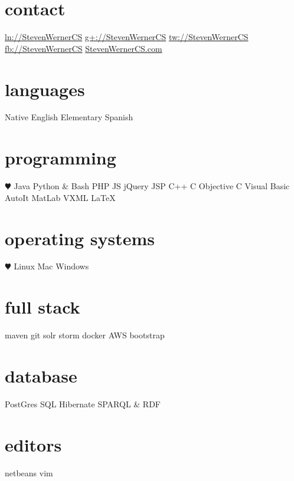 \documentclass[]{friggeri-cv} %
\begin{document}


\begin{aside1} 
\section{contact}
\href{http://linkedin.com/in/StevenWernerCS}{ln://StevenWernerCS}
\href{https://plus.google.com/+StevenWernerCS}{g+://StevenWernerCS}
\href{http://www.twitter.com/StevenWernerCS}{tw://StevenWernerCS}
\href{http://facebook.com/StevenWernerCS}{fb://StevenWernerCS}
\href{http://www.StevenWernerCS.com}{StevenWernerCS.com}
\section{languages}
Native English
Elementary Spanish
\section{programming}
{\color{red} $\varheartsuit$} Java Python \& Bash
PHP JS jQuery JSP
C++ C Objective C
Visual Basic AutoIt 
MatLab VXML LaTeX
\section{operating systems}
{\color{red} $\varheartsuit$} Linux Mac 
Windows
\section{full stack}
maven git
solr storm
docker AWS
bootstrap
\section{database}
PostGres SQL
Hibernate
SPARQL \& RDF
\section{editors}
netbeans vim
\end{aside1}
\end{document}

